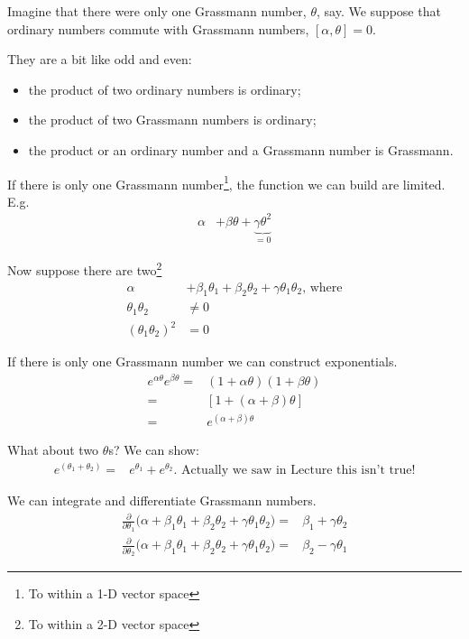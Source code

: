 \documentclass[]{article}
\begin{document}
Imagine that there were only one Grassmann number, $\theta$, say. We suppose that ordinary numbers commute with Grassmann numbers, $[\alpha,\theta]=0$.

They are a bit like odd and even:
\begin{itemize}
	\item the product of two ordinary numbers is ordinary;
	\item the product of two Grassmann numbers is ordinary;
	\item the product or an ordinary number and a Grassmann number is Grassmann.
\end{itemize}

If there is only one Grassmann number\footnote{To within a 1-D vector space}, the function we can build are limited. E.g.
\begin{align*}
	\alpha& + \beta \theta + \underbrace{\gamma \theta^2}_\text{$=0$} 
\end{align*}

Now suppose there are two\footnote{To within a 2-D vector space}
\begin{align*}
	\alpha& + \beta_1 \theta_1 + \beta_2 \theta_2 + \gamma \theta_1 \theta_2 \text{, where}\\
	\theta_1 \theta_2& \ne 0\\
	(\theta_1 \theta_2)^2& = 0
\end{align*}

If there is only one Grassmann number we can construct exponentials.
\begin{align*}
	e^{\alpha \theta} 	e^{\beta \theta} =& (1+\alpha \theta)(1+\beta \theta)\\
	=& [1+(\alpha + \beta) \theta]\\
	=& e^{(\alpha + \beta) \theta} 
\end{align*}

What about two $\theta$s? We can show:
\begin{align*}
	e^(\theta_1 + \theta_2) =& e^{\theta_1} + e^{\theta_2} \text{. Actually we saw in Lecture this isn't true!}
\end{align*}

We can integrate and differentiate Grassmann numbers.
\begin{align*}
	\frac{\partial}{\partial \theta_1} \big(\alpha + \beta_1 \theta_1 + \beta_2 \theta_2 + \gamma \theta_1 \theta_2 \big) =& \beta_1 + \gamma \theta_2\\
	\frac{\partial}{\partial \theta_2} \big(\alpha + \beta_1 \theta_1 + \beta_2 \theta_2 + \gamma \theta_1 \theta_2 \big) =& \beta_2 - \gamma \theta_1
\end{align*}
\end{document}
